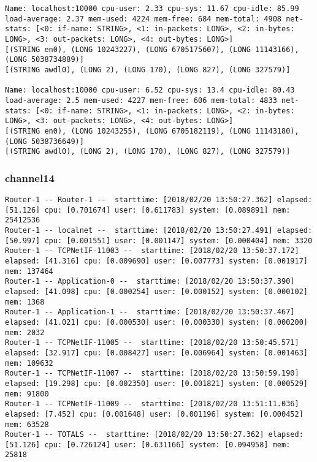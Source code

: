 \begin{lstlisting}[language=config]
Name: localhost:10000 cpu-user: 2.33 cpu-sys: 11.67 cpu-idle: 85.99 load-average: 2.37 mem-used: 4224 mem-free: 684 mem-total: 4908 net-stats: [<0: if-name: STRING>, <1: in-packets: LONG>, <2: in-bytes: LONG>, <3: out-packets: LONG>, <4: out-bytes: LONG>]
[(STRING en0), (LONG 10243227), (LONG 6705175607), (LONG 11143166), (LONG 5038734889)]
[(STRING awdl0), (LONG 2), (LONG 170), (LONG 827), (LONG 327579)]
 
Name: localhost:10000 cpu-user: 6.52 cpu-sys: 13.4 cpu-idle: 80.43 load-average: 2.5 mem-used: 4227 mem-free: 606 mem-total: 4833 net-stats: [<0: if-name: STRING>, <1: in-packets: LONG>, <2: in-bytes: LONG>, <3: out-packets: LONG>, <4: out-bytes: LONG>]
[(STRING en0), (LONG 10243255), (LONG 6705182119), (LONG 11143180), (LONG 5038736649)]
[(STRING awdl0), (LONG 2), (LONG 170), (LONG 827), (LONG 327579)]
 \end{lstlisting}

\subsubsection*{channel14}

\begin{lstlisting}[language=config]
Router-1 -- Router-1 --  starttime: [2018/02/20 13:50:27.362] elapsed: [51.126] cpu: [0.701674] user: [0.611783] system: [0.089891] mem: 25412536
Router-1 -- localnet --  starttime: [2018/02/20 13:50:27.491] elapsed: [50.997] cpu: [0.001551] user: [0.001147] system: [0.000404] mem: 3320
Router-1 -- TCPNetIF-11003 --  starttime: [2018/02/20 13:50:37.172] elapsed: [41.316] cpu: [0.009690] user: [0.007773] system: [0.001917] mem: 137464
Router-1 -- Application-0 --  starttime: [2018/02/20 13:50:37.390] elapsed: [41.098] cpu: [0.000254] user: [0.000152] system: [0.000102] mem: 1368
Router-1 -- Application-1 --  starttime: [2018/02/20 13:50:37.467] elapsed: [41.021] cpu: [0.000530] user: [0.000330] system: [0.000200] mem: 2032
Router-1 -- TCPNetIF-11005 --  starttime: [2018/02/20 13:50:45.571] elapsed: [32.917] cpu: [0.008427] user: [0.006964] system: [0.001463] mem: 109632
Router-1 -- TCPNetIF-11007 --  starttime: [2018/02/20 13:50:59.190] elapsed: [19.298] cpu: [0.002350] user: [0.001821] system: [0.000529] mem: 91800
Router-1 -- TCPNetIF-11009 --  starttime: [2018/02/20 13:51:11.036] elapsed: [7.452] cpu: [0.001648] user: [0.001196] system: [0.000452] mem: 63528
Router-1 -- TOTALS --  starttime: [2018/02/20 13:50:27.362] elapsed: [51.126] cpu: [0.726124] user: [0.631166] system: [0.094958] mem: 25818
\end{lstlisting}

